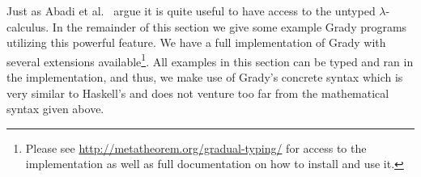 Just as Abadi et al.~\cite{Abadi:1989} argue it is quite useful to
have access to the untyped $\lambda$-calculus.  In the remainder of
this section we give some example Grady programs utilizing this
powerful feature.  We have a full implementation of Grady with several
extensions available\footnote{Please see
  \url{http://metatheorem.org/gradual-typing/} for access to the
  implementation as well as full documentation on how to install and
  use it.}.  All examples in this section can be typed and ran in the
implementation, and thus, we make use of Grady's concrete syntax which
is very similar to Haskell's and does not venture too far from the
mathematical syntax given above.

